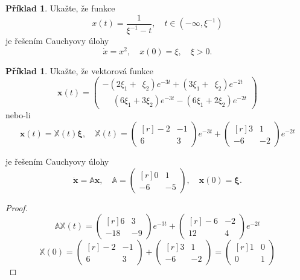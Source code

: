 \documentclass[a4paper, 12pt]{book}
\theoremstyle{definition}
\newtheorem{example}[theorem]{Příklad}
\def\vc#1{\mathbf{\boldsymbol{#1}}}     %
\def\tn#1{{\mathbb{#1}}}    %
\begin{document}
\begin{example}
Ukažte, že funkce
\begin{displaymath}
x(t) = \frac {1}{\xi^{-1}-t},\quad t\in(-\infty, \xi^{-1})
\end{displaymath}
je řešením Cauchyovy úlohy
\begin{displaymath}
\dot x = x^2,\quad x(0)=\xi,\quad \xi>0.
\end{displaymath}
\end{example}

\begin{example}
Ukažte, že vektorová funkce
\[
\vc x(t) = 
\begin{pmatrix}
-(2\xi_1 + \phantom{3}\xi_2)e^{-3t}+(3\xi_1 + \phantom{2}\xi_2)e^{-2t}\\
\phantom{-}(6\xi_1 + 3\xi_2)e^{-3t}-(6\xi_1 + 2\xi_2)e^{-2t}
\end{pmatrix}
\]
nebo-li
\[
\vc x(t)= \tn X(t) \vc \xi,\quad
\tn X(t)=
\begin{pmatrix*}[r]
 -2 &-1\\
  6 & 3
\end{pmatrix*}
e^{-3t}
+
\begin{pmatrix*}[r]
  3 & 1\\
  -6 & -2
\end{pmatrix*}
e^{-2t}
\]

je řešením Cauchyovy úlohy
\[
\dot{\vc x} = \tn A \vc x, \quad
\tn A = 
\begin{pmatrix*}[r]
0 & 1\\
-6 & -5
\end{pmatrix*}, \quad
\vc x(0) = \vc \xi.
\]
\end{example}
\begin{proof}
\[
\tn A \tn X(t) =
\begin{pmatrix*}[r]
 6 &3\\
  -18 &-9
\end{pmatrix*}
e^{-3t}
+
\begin{pmatrix*}[r]
 -6 & -2\\
  12 & 4
\end{pmatrix*}
e^{-2t}
\]
\[
  \tn X(0) = 
\begin{pmatrix*}[r]
 -2 &-1\\
  6 & 3
\end{pmatrix*}
+
\begin{pmatrix*}[r]
  3 & 1\\
  -6 & -2
\end{pmatrix*}
=
\begin{pmatrix*}[r]
  1 & 0\\
  0 & 1
\end{pmatrix*}
\]
\end{proof}
\end{document}
